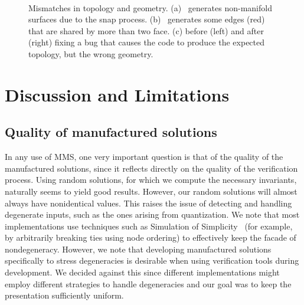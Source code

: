 \begin{figure}[t]
\centering
{} ~~~~~~~~
 ~~~~~~~~
\caption{Mismatches in topology and geometry. (a) \snapmc\ generates
  non-manifold surfaces due to the snap process. (b)
  \matlab\ generates some edges (red) that are shared by more than two
  face. (c) \mcsimpleflow before (left) and after (right) fixing a bug
  that causes the code to produce the expected topology, but the wrong
  geometry.}
\label{fig:inconsistencies}
\end{figure}


\section{Discussion and Limitations}
\label{sec:discussion}

\subsection{Quality of manufactured solutions}
In any use of MMS, one very important question is that of the quality
of the manufactured solutions, since it reflects directly on the
quality of the verification process. Using random solutions, for which
we compute the necessary invariants, naturally seems to yield good
results. However, our random solutions will almost always have
nonidentical values. This raises the issue of detecting and handling
degenerate inputs, such as the ones arising from quantization. We
note that most implementations use techniques such as Simulation of
Simplicity~\cite{Edelsbrunner:1990:SOS} (for example, by arbitrarily breaking ties using node
ordering) to effectively keep the facade of nondegeneracy. However, we note
that developing manufactured solutions
specifically to stress degeneracies is desirable when using
verification tools during development. We decided against this since
different implementations might employ different strategies to handle
degeneracies and our goal was to keep the presentation sufficiently
uniform.

